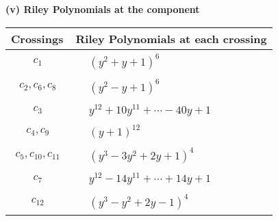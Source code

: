 \documentclass[1p]{elsarticle_modified}
\theoremstyle{definition}
\begin{document}
\newpage\renewcommand{\arraystretch}{1}
\flushleft \textbf{(v) Riley Polynomials at the component}\newline \\
\begin{tabular}{m{50pt}|m{274pt}}
Crossings & \hspace{64pt}Riley Polynomials at each crossing \\
\hline $$\begin{aligned}c_{1}\end{aligned}$$&$\begin{aligned}
&(y^2+y+1)^6
\end{aligned}$\\
\hline $$\begin{aligned}c_{2},c_{6},c_{8}\end{aligned}$$&$\begin{aligned}
&(y^2- y+1)^6
\end{aligned}$\\
\hline $$\begin{aligned}c_{3}\end{aligned}$$&$\begin{aligned}
&y^{12}+10 y^{11}+\cdots-40 y+1
\end{aligned}$\\
\hline $$\begin{aligned}c_{4},c_{9}\end{aligned}$$&$\begin{aligned}
&(y+1)^{12}
\end{aligned}$\\
\hline $$\begin{aligned}c_{5},c_{10},c_{11}\end{aligned}$$&$\begin{aligned}
&(y^3-3 y^2+2 y+1)^4
\end{aligned}$\\
\hline $$\begin{aligned}c_{7}\end{aligned}$$&$\begin{aligned}
&y^{12}-14 y^{11}+\cdots+14 y+1
\end{aligned}$\\
\hline $$\begin{aligned}c_{12}\end{aligned}$$&$\begin{aligned}
&(y^3- y^2+2 y-1)^4
\end{aligned}$\\
\hline
\end{tabular}\\~\\
\end{document}
